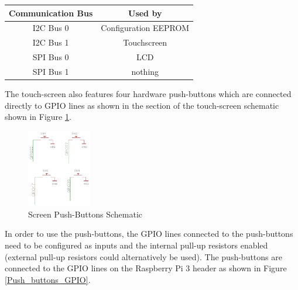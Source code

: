 \documentclass{article}
\begin{document}
	\begin{table}[H]
		\centering
		
		\begin{tabular}[H]{| c | c |}
			\hline
			\textbf{Communication Bus} & \textbf{Used by} \\
			\hline
			I2C Bus 0 & Configuration EEPROM \\
			\hline
			I2C Bus 1 & Touchscreen \\
			\hline
			SPI Bus 0 & LCD \\
			\hline
			SPI Bus 1 & nothing \\
			\hline
		\end{tabular}
	\end{table}


The touch-screen also features four hardware push-buttons which are connected directly to GPIO lines as shown in the section of the touch-screen schematic shown in Figure \ref{Push_buttons_schematic}.


	\begin{figure}[H]
		\centering
		\includegraphics[width=0.25\textwidth]{pics/PiTFT_2-8_push-buttons_section_schematic.png}
		\caption{Screen Push-Buttons Schematic}
		\label{Push_buttons_schematic}
	\end{figure}


In order to use the push-buttons, the GPIO lines connected to the push-buttons need to be configured as inputs and the internal pull-up resistors enabled (external pull-up resistors could alternatively be used). The push-buttons are connected to the GPIO lines on the Raspberry Pi 3 header as shown in Figure \ref{Push_buttons_GPIO}.
\end{document}

